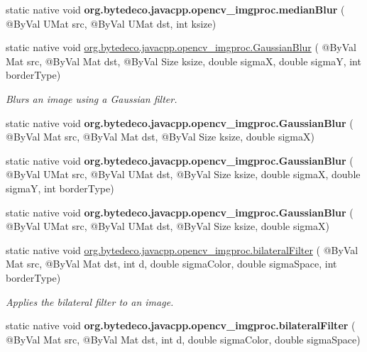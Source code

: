 \begin{DoxyCompactItemize}
static native void {\bfseries org.\+bytedeco.\+javacpp.\+opencv\+\_\+imgproc.\+median\+Blur} ( @By\+Val U\+Mat src, @By\+Val U\+Mat dst, int ksize)
\item 
static native void \hyperlink{group__imgproc__filter_gaf8f0c37e9b9c420a8edfc2753c8fe966}{org.\+bytedeco.\+javacpp.\+opencv\+\_\+imgproc.\+Gaussian\+Blur} ( @By\+Val Mat src, @By\+Val Mat dst, @By\+Val Size ksize, double sigmaX, double sigmaY, int border\+Type)
\begin{DoxyCompactList}\small\item\em Blurs an image using a Gaussian filter. \end{DoxyCompactList}\item 
\mbox{\label{group__imgproc__filter_ga5436223800bf00e56241c7b4f4cceb82}} 
static native void {\bfseries org.\+bytedeco.\+javacpp.\+opencv\+\_\+imgproc.\+Gaussian\+Blur} ( @By\+Val Mat src, @By\+Val Mat dst, @By\+Val Size ksize, double sigmaX)
\item 
\mbox{\label{group__imgproc__filter_gadbb35488e6d6fa62f650cc63f07f61ef}} 
static native void {\bfseries org.\+bytedeco.\+javacpp.\+opencv\+\_\+imgproc.\+Gaussian\+Blur} ( @By\+Val U\+Mat src, @By\+Val U\+Mat dst, @By\+Val Size ksize, double sigmaX, double sigmaY, int border\+Type)
\item 
\mbox{\label{group__imgproc__filter_ga115a0ed9b751bdcf6c95cee0437eb35d}} 
static native void {\bfseries org.\+bytedeco.\+javacpp.\+opencv\+\_\+imgproc.\+Gaussian\+Blur} ( @By\+Val U\+Mat src, @By\+Val U\+Mat dst, @By\+Val Size ksize, double sigmaX)
\item 
static native void \hyperlink{group__imgproc__filter_ga15d81db5deb10dd5c7f6ff4b6193a644}{org.\+bytedeco.\+javacpp.\+opencv\+\_\+imgproc.\+bilateral\+Filter} ( @By\+Val Mat src, @By\+Val Mat dst, int d, double sigma\+Color, double sigma\+Space, int border\+Type)
\begin{DoxyCompactList}\small\item\em Applies the bilateral filter to an image. \end{DoxyCompactList}\item 
\mbox{\label{group__imgproc__filter_ga100abc7b6604cc022372a61f7c7f85ea}} 
static native void {\bfseries org.\+bytedeco.\+javacpp.\+opencv\+\_\+imgproc.\+bilateral\+Filter} ( @By\+Val Mat src, @By\+Val Mat dst, int d, double sigma\+Color, double sigma\+Space)

\end{DoxyCompactItemize}
